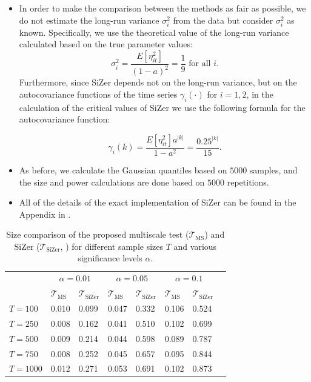 \documentclass[a4paper,12pt]{article}
\begin{document}
\begin{enumerate}[label=\arabic*.,leftmargin=0.6cm]
{\begin{itemize}[topsep=0pt]
\begin{itemize}[label=--,leftmargin=0.45cm,itemsep=0pt]
\item In order to make the comparison between the methods as fair as possible, we do not estimate the long-run variance $\sigma_i^2$ from the data but consider $\sigma_i^2$ as known. Specifically, we use the theoretical value of the long-run variance calculated based on the true parameter values: $$\sigma_i^2 = \frac{E[\eta_{it}^2]}{(1 - a)^2} = \frac{1}{9} \text{ for all }i.$$ Furthermore, since SiZer depends not on the long-run variance, but on the autocovariance functions of the time series $\gamma_i(\cdot)$ for $i=1, 2$, in the calculation of the critical values of SiZer we use the following formula for the autocovariance function:

$$\gamma_{i}(k) = \frac{E[\eta_{it}^2] a^{|k|}}{1 - a^2} = \frac{0.25^{|k|}}{15}.$$

\item As before, we calculate the Gaussian quantiles based on $5000$ samples, and the size and power calculations are done based on $5000$ repetitions.
\item All of the details of the exact implementation of SiZer can be found in the Appendix in \cite{KhismatullinaVogt2020}.

\end{itemize}

\begin{table}[t!]
\footnotesize{
\caption{Size comparison of the proposed multiscale test ($\mathcal{T}_{\text{MS}}$) and SiZer ($\mathcal{T}_{\text{SiZer}}$, \cite{Park2009}) for different sample sizes $T$ and various significance levels $\alpha$.}\label{tab:size:compare}
\begin{tabularx}{\textwidth}{l@{\hskip 20pt} Z@{\hskip 6pt}Z@{\hskip 20pt}Z@{\hskip 6pt}Z@{\hskip 6pt}Z@{\hskip 6pt}Z@{\hskip 20pt}Z}
\toprule
 &  &  & \\
 & $\mathcal{T}_{\text{MS}}$ & $\mathcal{T}_{\text{SiZer}}$   & $\mathcal{T}_{\text{MS}}$ & $\mathcal{T}_{\text{SiZer}}$ & $\mathcal{T}_{\text{MS}}$ & $\mathcal{T}_{\text{SiZer}}$\\
  $T = 100$ & 0.010 & 0.099 & 0.047 & 0.332 & 0.106 & 0.524 \\ 
  $T = 250$ & 0.008 & 0.162 & 0.041 & 0.510 & 0.102 & 0.699 \\ 
  $T = 500$ & 0.009 & 0.214 & 0.044 & 0.598 & 0.089 & 0.787 \\ 
  $T = 750$ & 0.008 & 0.252 & 0.045 & 0.657 & 0.095 & 0.844 \\ 
  $T = 1000$ & 0.012 & 0.271 & 0.053 & 0.691 & 0.102 & 0.873 \\ 
\bottomrule
\end{tabularx}}
\vspace{0.2cm}
\end{table}


\end{itemize}}
\end{enumerate}
\end{document}
